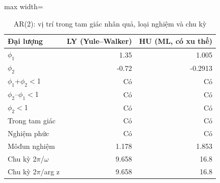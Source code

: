 \begin{table}[H]
\centering\small
\caption{AR(2): vị trí trong tam giác nhân quả, loại nghiệm và chu kỳ}\label{tab:tab_b11_08_ar2_triangle}
\begin{adjustbox}{max width=\linewidth}
\begin{tabular}{lrr}
\toprule
Đại lượng & LY (Yule–Walker) & HU (ML, có xu thế) \\
\midrule
$\phi_{1}$ & 1.35 & 1.005 \\
$\phi_{2}$ & -0.72 & -0.2913 \\
$\phi_{1}$+$\phi_{2}<$1 & Có & Có \\
$\phi_{2}$–$\phi_{1}<$1 & Có & Có \\
\textbar{}$\phi_{2}$\textbar{}$<$1 & Có & Có \\
Trong tam giác & Có & Có \\
Nghiệm phức & Có & Có \\
Môđun nghiệm & 1.178 & 1.853 \\
Chu kỳ 2$\pi$/$\omega$ & 9.658 & 16.8 \\
Chu kỳ 2$\pi$/\textbar{}arg z\textbar{} & 9.658 & 16.8 \\
\bottomrule
\end{tabular}
\end{adjustbox}
\end{table}
